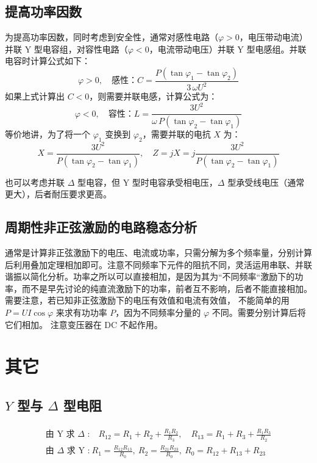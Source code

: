 \documentclass[a4paper]{article}  %
\theoremstyle{MyLineTheoremStyle} %
\theoremstyle{MyBlockTheoremStyle} %
\theoremstyle{MySubsubsectionStyle} %
\begin{document}
\begin{multicols*}{4}
\subsection{提高功率因数}

为提高功率因数，同时考虑到安全性，通常对感性电路（$\varphi > 0$，电压带动电流）并联 Y 型电容组，对容性电路（$\varphi < 0$，电流带动电压）并联 Y 型电感组。并联电容时计算公式如下：
\begin{equation}
\varphi > 0,\quad \text{感性：}
C = \frac{P(\tan \varphi_1 - \tan \varphi_2)}{3\,\omega U^2}
\end{equation}
如果上式计算出 $C < 0$，则需要并联电感，计算公式为：
\begin{equation}
\varphi < 0,\quad \text{容性：}
L = \frac{3 U^2}{\omega \, P (\tan \varphi_2 - \tan \varphi_1)}
\end{equation}
等价地讲，为了将一个 $\varphi_1$ 变换到 $\varphi_2$，需要并联的电抗 $X$ 为：
\begin{equation}
X = \frac{3 U^2}{P (\tan \varphi_2 - \tan \varphi_1)},\quad 
Z = j X = j \frac{3 U^2}{P (\tan \varphi_2 - \tan \varphi_1)} 
\end{equation}

也可以考虑并联 $\Delta$ 型电容，但 Y 型时电容承受相电压，$\Delta$ 型承受线电压（通常更大），后者耐压要求更高。


\subsection{周期性非正弦激励的电路稳态分析}

通常是计算非正弦激励下的电压、电流或功率，只需分解为多个频率量，分别计算后利用叠加定理相加即可。注意不同频率下元件的阻抗不同，灵活运用串联、并联谐振以简化分析。功率之所以可以直接相加，是因为其为“不同频率“激励下的功率，而不是早先讨论的纯直流激励下的功率，前者互不影响，后者不能直接相加。需要注意，若已知非正弦激励下的电压有效值和电流有效值，{\color{red} 不能简单的用 $P = U I \cos \varphi$ 来求有功功率 $P$}，因为不同频率分量的 $\varphi$ 不同。需要分别计算后将它们相加。{\color{red} 注意变压器在 DC 不起作用}。


\section{其它}

\subsection{$Y$ 型与 $\Delta$ 型电阻}
\begin{gather}
    \begin{matrix}
        \text{由 Y 求 $\Delta$ :}\quad R_{12}= R_1 + R_2 + \frac{R_1R_2}{R_3}, \quad
        R_{13}=R_1 + R_3 + \frac{R_1R_3}{R_2} \\
        \text{由 $\Delta$ 求 Y :}\  R_{1}=\frac{R_{12}R_{13}}{R_0},\ 
        R_{2}=\frac{R_{21}R_{23}}{R_0},\ 
        R_0 = R_{12}+R_{13}+R_{23} 
    \end{matrix}
\end{gather}


\end{multicols*}
\end{document}
